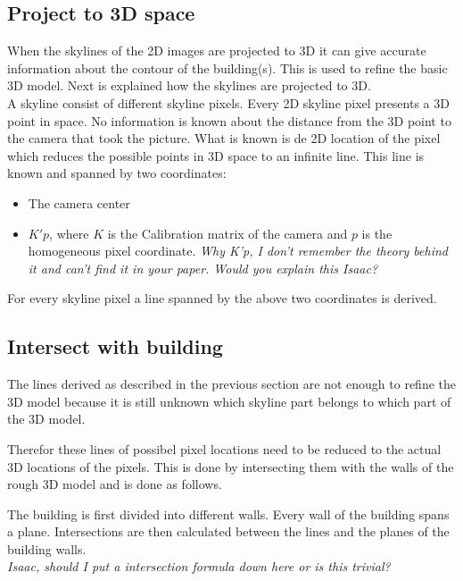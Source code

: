 \documentclass[10pt]{article}
\begin{document}
\subsection{Project to 3D space}
When the skylines of the 2D images are projected to 3D it can give 
accurate information about the contour of the building(s). This is used to
refine the basic 3D model.  Next is explained how the skylines are projected to
3D.\\

A skyline consist of different skyline pixels. Every 2D skyline pixel presents a 3D point in space. No
information is known about the distance from the 3D point to the camera that
took the picture. What is known is de 2D location of the pixel which reduces the possible points in 3D
space to an infinite line.  This line is known and spanned by two 
coordinates:\\ 
\begin{itemize}
	\item The camera center %
	\item $K'p$, where $K$ is the Calibration matrix of the camera and $p$ is the homogeneous pixel coordinate.
	\textit{Why K'p, I don't remember the theory behind it and can't find it in your paper. Would you explain this Isaac?}
\end{itemize}


For every skyline pixel a line spanned by the above two coordinates is derived.


\subsection{Intersect with building}
The lines derived as described in the previous section are not enough to refine
the 3D model because it is still unknown which skyline part belongs to which
part of the 3D model.

Therefor these lines of possibel pixel locations need to
be reduced to the actual 3D locations of the pixels.  This is done by intersecting
them with the walls of the rough 3D model and is done as follows.

The building is first divided into different walls.  Every wall of the building spans a plane. 
Intersections are then calculated between the lines and the planes of the building walls.\\
\textit{Isaac, should I put a intersection formula down here or is this trivial?}\\
\end{document}
